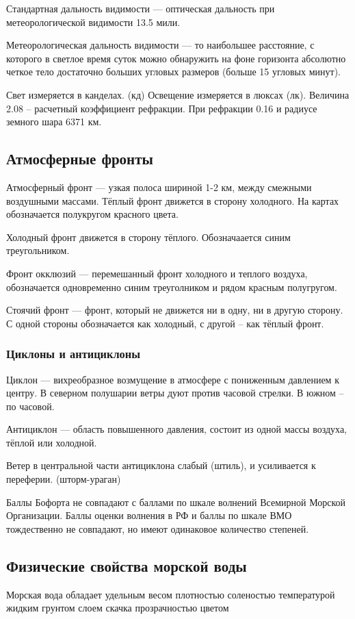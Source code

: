 \documentclass{article}        %
\begin{document}
Стандартная дальность видимости --- оптическая дальность при метеорологической видимости 13.5 мили.

Метеорологическая дальность видимости --- то наибольшее расстояние, с которого в светлое время суток можно обнаружить на фоне горизонта абсолютно четкое тело достаточно больших угловых 
размеров (больше 15 угловых минут).

Свет измеряется в канделах. (кд) Освещение измеряется в люксах (лк). Величина 2.08 -- расчетный коэффициент рефракции. При рефракции 0.16 и радиусе земного шара 6371 км.

\subsection{Атмосферные фронты}
Атмосферный фронт --- узкая полоса шириной 1-2 км, между смежными воздушными массами.
Тёплый фронт движется в сторону холодного. На картах обозначается полукругом красного цвета.

Холодный фронт движется в сторону тёплого. Обозначаается синим треугольником.

Фронт окклюзий --- перемешанный фронт холодного и теплого воздуха, обозначается одновременно синим треуголником и рядом красным полугругом.

Стоячий фронт --- фронт, который не движется ни в одну, ни в другую сторону. С одной стороны обозначается как холодный, с другой -- как тёплый фронт.

\subsubsection{Циклоны и антициклоны}
Циклон --- вихреобразное возмущение в атмосфере с пониженным давлением к центру.
В северном полушарии ветры дуют против часовой стрелки. В южном -- по часовой.

Антициклон --- область повышенного давления, состоит из одной массы воздуха, тёплой или холодной.

Ветер в центральной части антициклона слабый (штиль), и усиливается к переферии. 
(шторм-ураган)

Баллы Бофорта не совпадают с баллами по шкале волнений Всемирной Морской Организации. Баллы оценки волнения в РФ и баллы по шкале ВМО тождественно не совпадают, но имеют одинаковое количество степеней.


\subsection{Физические свойства морской воды}
Морская вода обладает
	удельным весом
	плотностью
	соленостью
	температурой
	жидким грунтом
	слоем скачка
	прозрачностью 
	цветом
\end{document}
